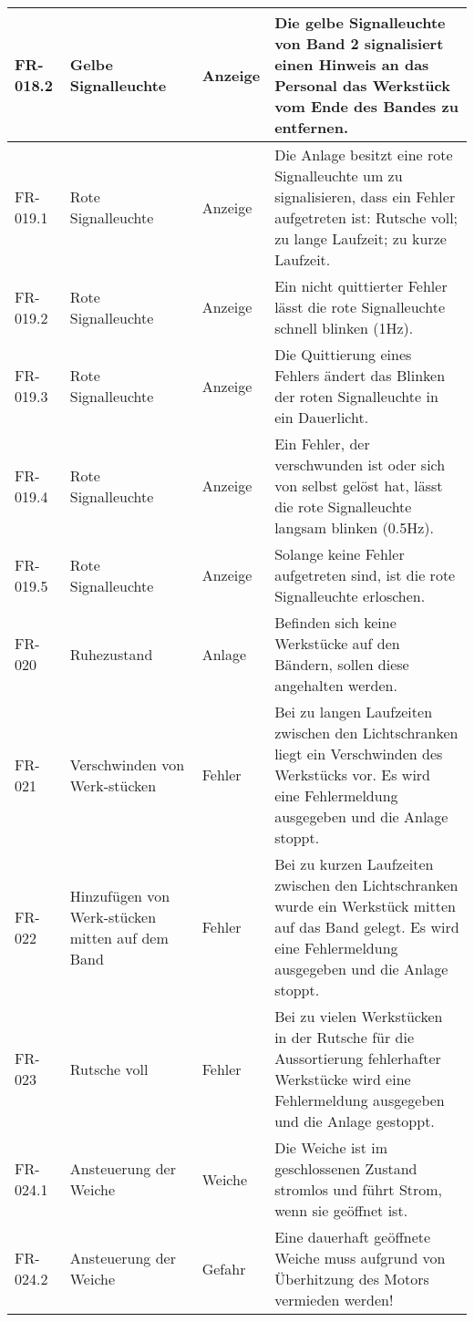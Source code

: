 \documentclass[oneside,a4paper,titlepage]{scrartcl} %
\begin{document}
\begin{small}
\begin{longtable}{|p{2cm}|p{4cm}|p{1.5cm}|p{5.5cm}|}
  \hline
  \rowcolor{gray} FR-018.2 & Gelbe Signalleuchte & Anzeige & Die gelbe Signalleuchte von Band 2 signalisiert einen Hinweis an das Personal das Werkstück vom Ende des Bandes zu entfernen.\\
  \hline
  FR-019.1 & Rote Signalleuchte & Anzeige & Die Anlage besitzt eine rote Signalleuchte um zu signalisieren, dass ein Fehler aufgetreten ist: Rutsche voll; zu lange Laufzeit; zu kurze Laufzeit.\\
  \hline
  FR-019.2 & Rote Signalleuchte & Anzeige & Ein nicht quittierter Fehler lässt die rote Signalleuchte schnell blinken (1Hz).\\
  \hline
  FR-019.3 & Rote Signalleuchte & Anzeige & Die Quittierung eines Fehlers ändert das Blinken der roten Signalleuchte in ein Dauerlicht.\\
  \hline
  FR-019.4 & Rote Signalleuchte & Anzeige & Ein Fehler, der verschwunden ist oder sich von selbst gelöst hat, lässt die rote Signalleuchte langsam blinken (0.5Hz).\\
  \hline
  FR-019.5 & Rote Signalleuchte & Anzeige & Solange keine Fehler aufgetreten sind, ist die rote Signalleuchte erloschen.\\
  \hline
  \rowcolor{gray} FR-020 & Ruhezustand & Anlage & Befinden sich keine Werkstücke auf den Bändern, sollen diese angehalten werden.\\
  \hline
  FR-021 & Verschwinden von Werk-stücken & Fehler & Bei zu langen Laufzeiten zwischen den Lichtschranken liegt ein Verschwinden des Werkstücks vor. Es wird eine Fehlermeldung ausgegeben und die Anlage stoppt.\\
  \hline
  \rowcolor{gray} FR-022 & Hinzufügen von Werk-stücken mitten auf dem Band & Fehler & Bei zu kurzen Laufzeiten zwischen den Lichtschranken wurde ein Werkstück mitten auf das Band gelegt. Es wird eine Fehlermeldung ausgegeben und die Anlage stoppt.\\
  \hline
  FR-023 & Rutsche voll & Fehler & Bei zu vielen Werkstücken in der Rutsche für die Aussortierung fehlerhafter Werkstücke wird eine Fehlermeldung ausgegeben und die Anlage gestoppt.\\
  \hline
  \rowcolor{gray} FR-024.1 & Ansteuerung der Weiche & Weiche & Die Weiche ist im geschlossenen Zustand stromlos und führt Strom, wenn sie geöffnet ist.\\
  \hline
  \rowcolor{gray} FR-024.2 & Ansteuerung der Weiche & Gefahr & Eine dauerhaft geöffnete Weiche muss aufgrund von Überhitzung des Motors vermieden werden!\\

\end{longtable}
\end{small}
\end{document}
